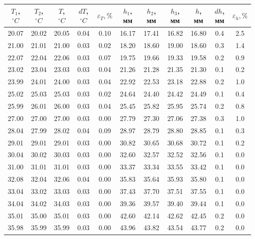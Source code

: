 \documentclass[a4paper,12pt]{article} %
\begin{document}
\begin{enumerate}
  \begin{table}[h]
    \centering
    \begin{tabular}{|c|c|c|c|c|c|c|c|c|c|c|}
        \hline
        $T_1$, $^\circ C$ & $T_2$, $^\circ C$ & $T$, $^\circ C$ & $dT$, $^\circ C$ & $\varepsilon_T, \%$ & $h_1$, мм & $h_2$, мм  & $h_3$, мм  & $h$, мм  & $dh$, мм  & $\varepsilon_h, \%$ \\
        \hline
        20.07 & 20.02 & 20.05 & 0.04 & 0.10 & 16.17 & 17.41 & 16.82 & 16.80 & 0.4 & 2.5 \\
        21.00 & 21.01 & 21.00 & 0.03 & 0.02 & 18.20 & 18.60 & 19.00 & 18.60 & 0.3 & 1.4 \\
        22.07 & 22.04 & 22.06 & 0.03 & 0.07 & 19.75 & 19.66 & 19.33 & 19.58 & 0.2 & 0.9 \\
        23.02 & 23.04 & 23.03 & 0.03 & 0.04 & 21.26 & 21.28 & 21.35 & 21.30 & 0.1 & 0.2 \\
        23.99 & 24.01 & 24.00 & 0.03 & 0.04 & 22.92 & 22.53 & 23.18 & 22.88 & 0.2 & 1.0 \\
        25.02 & 25.03 & 25.03 & 0.03 & 0.02 & 24.64 & 24.40 & 24.42 & 24.49 & 0.1 & 0.4 \\
        25.99 & 26.01 & 26.00 & 0.03 & 0.04 & 25.45 & 25.82 & 25.95 & 25.74 & 0.2 & 0.8 \\
        27.00 & 27.00 & 27.00 & 0.03 & 0.00 & 27.79 & 27.30 & 27.06 & 27.38 & 0.3 & 1.0 \\
        28.04 & 27.99 & 28.02 & 0.04 & 0.09 & 28.97 & 28.79 & 28.80 & 28.85 & 0.1 & 0.3 \\
        29.01 & 29.01 & 29.01 & 0.03 & 0.00 & 30.82 & 30.65 & 30.68 & 30.72 & 0.1 & 0.2 \\
        30.04 & 30.02 & 30.03 & 0.03 & 0.00 & 32.60 & 32.57 & 32.52 & 32.56 & 0.1 & 0.0 \\
        31.00 & 31.01 & 31.01 & 0.03 & 0.00 & 33.37 & 33.34 & 33.55 & 33.42 & 0.1 & 0.0 \\
        32.08 & 32.04 & 32.06 & 0.04 & 0.00 & 35.83 & 35.64 & 35.93 & 35.80 & 0.1 & 0.0 \\
        33.04 & 33.02 & 33.03 & 0.03 & 0.00 & 37.43 & 37.70 & 37.51 & 37.55 & 0.1 & 0.0 \\
        34.04 & 34.02 & 34.03 & 0.03 & 0.00 & 39.36 & 39.57 & 39.40 & 39.44 & 0.1 & 0.0 \\
        35.01 & 35.00 & 35.01 & 0.03 & 0.00 & 42.60 & 42.14 & 42.62 & 42.45 & 0.2 & 0.0 \\
        35.98 & 35.99 & 35.99 & 0.03 & 0.00 & 43.96 & 43.82 & 43.54 & 43.77 & 0.2 & 0.0 \\

\end{tabular}
\end{table}
\end{enumerate}
\end{document}
